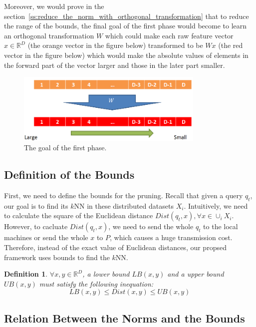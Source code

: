 Moreover, we would prove in the section~\ref{ss:reduce_the_norm_with_orthogonal_transformation} that to reduce the range of the bounds, the final goal of the first phase would become to learn an orthogonal transformation $W$ which could make each raw feature vector $x\in \mathbb{R}^D$ (the orange vector in the figure below) transformed to be $Wx$ (the red vector in the figure below) which would make the absolute values of elements in the forward part of the vector larger and those in the later part smaller.
\begin{figure}[htpb!]
  \centering
    \includegraphics[width=0.8\textwidth]{fig/important.png}
    \caption{\label{fig:flow}The goal of the first phase.}
\end{figure}



\subsection{Definition of the Bounds} %
\label{ss:definition_of_the_bounds}

First, we need to define the bounds for the pruning.  Recall that given a query $q_t$, our goal is to find its $k$NN in these distributed datasets $X_i$.  Intuitively, we need to calculate the square of the Euclidean distance $Dist(q_t,x), \forall x\in \cup_i X_i$.  However, to cacluate $Dist(q_t,x)$, we need to send the whole $q_t$ to the local machines or send the whole $x$ to $P$, which causes a huge transmission cost.  Therefore, instead of the exact value of Euclidean distances, our propsed framework uses bounds to find the $k$NN.

\newtheorem{Bounds}{\bf Definition}
\begin{Bounds}
$\forall x,y \in \mathbb{R}^D$, a lower bound $LB(x,y)$ and a upper bound $UB(x,y)$ must satisfy the following inequation:
\[
LB(x,y)\leq Dist(x,y) \leq UB(x,y)
\]
\end{Bounds}

\subsection{Relation Between the Norms and the Bounds} %
\label{sub:relation_between_the_norms_and_the_bounds}

